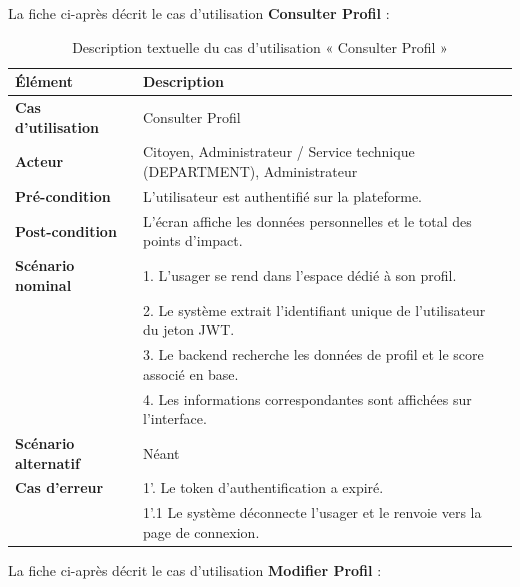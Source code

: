 La fiche ci-après décrit le cas d'utilisation \textbf{\og Consulter Profil \fg{}} :

\begin{table}[H]
    \centering
    \caption{Description textuelle du cas d'utilisation « Consulter Profil »}
    \label{tab:txt_consulter_prof}
    \vspace{0.2cm}
    \small
    \begin{tabularx}{\textwidth}{|l|X|}
        \hline
        \textbf{Élément} & \textbf{Description} \\ \hline
        \textbf{Cas d’utilisation} & Consulter Profil \\ \hline
        \textbf{Acteur} & Citoyen, Administrateur / Service technique (DEPARTMENT), Administrateur \\ \hline
        \textbf{Pré-condition} & L'utilisateur est authentifié sur la plateforme. \\ \hline
        \textbf{Post-condition} & L'écran affiche les données personnelles et le total des points d'impact. \\ \hline
        \textbf{Scénario nominal} &
        1. L'usager se rend dans l'espace dédié à son profil.\\
        & 2. Le système extrait l'identifiant unique de l'utilisateur du jeton JWT.\\
        & 3. Le backend recherche les données de profil et le score associé en base.\\
        & 4. Les informations correspondantes sont affichées sur l'interface. \\ \hline
        \textbf{Scénario alternatif} & Néant \\ \hline
        \textbf{Cas d’erreur} &
        1'. Le token d'authentification a expiré.\\
        & 1'.1 Le système déconnecte l'usager et le renvoie vers la page de connexion. \\ \hline
    \end{tabularx}
\end{table}

La fiche ci-après décrit le cas d'utilisation \textbf{\og Modifier Profil \fg{}} :

